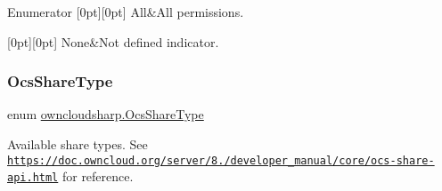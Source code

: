 \begin{DoxyEnumFields}{Enumerator}
[0pt][0pt]{}\mbox{\label{namespaceowncloudsharp_a86ba7b86b85c7f5be2304a1ef7ae3157ab1c94ca2fbc3e78fc30069c8d0f01680}} 
All&All permissions. \\
\hline

[0pt][0pt]{}\mbox{\label{namespaceowncloudsharp_a86ba7b86b85c7f5be2304a1ef7ae3157a6adf97f83acf6453d4a6a4b1070f3754}} 
None&Not defined indicator. \\
\hline

\end{DoxyEnumFields}
\mbox{\label{namespaceowncloudsharp_a51141c9a2e84eaced736ab96ea4b2f0b}} 
\subsubsection{\texorpdfstring{Ocs\+Share\+Type}{OcsShareType}}
{\footnotesize\ttfamily enum \hyperlink{namespaceowncloudsharp_a51141c9a2e84eaced736ab96ea4b2f0b}{owncloudsharp.\+Ocs\+Share\+Type}\hspace{0.3cm}{\ttfamily [strong]}}



Available share types. See {\ttfamily \href{https://doc.owncloud.org/server/8.2/developer_manual/core/ocs-share-api.html}{\tt https\+://doc.\+owncloud.\+org/server/8./developer\+\_\+manual/core/ocs-\/share-\/api.\+html}} for reference. 


